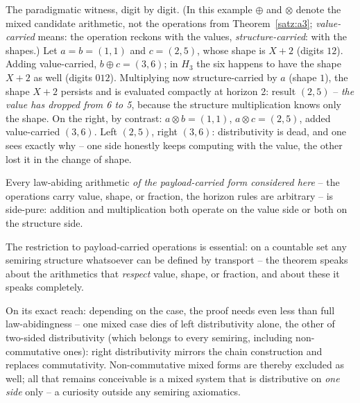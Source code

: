\begin{beispiel}
The paradigmatic witness, digit by digit. (In this example $\oplus$
and $\otimes$ denote the mixed candidate arithmetic, not the
operations from Theorem~\ref{satz:a3}; \emph{value-carried} means:
the operation reckons with the values, \emph{structure-carried}:
with the shapes.) Let $a=b=(1,1)$ and
$c=(2,5)$, whose shape is $X+2$ (digits $12$). Adding
value-carried, $b\oplus c=(3,6)$; in $H_3$ the six happens to have
the shape $X+2$ as well (digits $012$). Multiplying now
structure-carried by $a$ (shape $1$), the shape $X+2$ persists and
is evaluated compactly at horizon 2: result
$(2,5)$ -- \emph{the value has dropped from 6 to 5}, because the
structure multiplication knows only the shape. On the right, by
contrast: $a\otimes b=(1,1)$, $a\otimes c=(2,5)$, added
value-carried $(3,6)$. Left $(2,5)$, right $(3,6)$: distributivity
is dead, and one sees exactly why -- one side honestly keeps
computing with the value, the other lost it in the change of
shape.
\end{beispiel}

\begin{satz}\label{satz:seitentreue}
Every law-abiding arithmetic \emph{of the payload-carried form
considered here} -- the operations carry value, shape,
or fraction, the horizon rules are arbitrary -- is side-pure:
addition and multiplication both operate on the value side or
both on the structure side.
\end{satz}

The restriction to payload-carried operations is essential: on a
countable set any semiring structure whatsoever can be defined by
transport -- the theorem speaks about the arithmetics that
\emph{respect} value, shape, or fraction, and about these it
speaks completely.

On its exact reach: depending on the case, the proof needs even
less than full law-abidingness -- one mixed case dies of left
distributivity alone, the other of two-sided distributivity (which
belongs to every semiring, including non-commutative ones): right
distributivity mirrors the chain construction and replaces
commutativity. Non-commutative mixed forms are thereby excluded as
well; all that remains conceivable is a mixed system that is
distributive on \emph{one side} only -- a curiosity outside any
semiring axiomatics.


